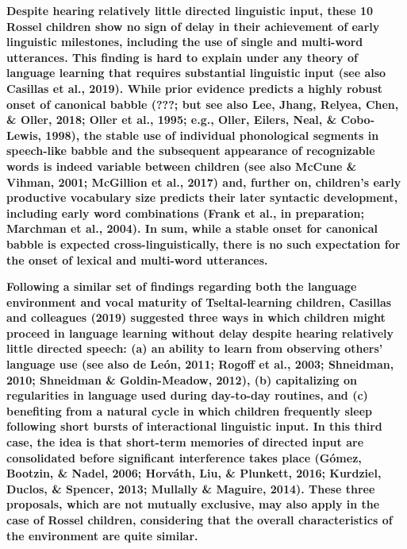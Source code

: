 \documentclass[,man,floatsintext]{apa6}
\begin{document}
\textbf{Despite hearing relatively little directed linguistic input,
these 10 Rossel children show no sign of delay in their achievement of
early linguistic milestones, including the use of single and multi-word
utterances. This finding is hard to explain under any theory of language
learning that requires substantial linguistic input (see also Casillas
et al., 2019). While prior evidence predicts a highly robust onset of
canonical babble ({\textbf{???}}; but see also Lee, Jhang, Relyea, Chen,
\& Oller, 2018; Oller et al., 1995; e.g., Oller, Eilers, Neal, \&
Cobo-Lewis, 1998), the stable use of individual phonological segments in
speech-like babble and the subsequent appearance of recognizable words
is indeed variable between children (see also McCune \& Vihman, 2001;
McGillion et al., 2017) and, further on, children's early productive
vocabulary size predicts their later syntactic development, including
early word combinations (Frank et al., in preparation; Marchman et al.,
2004). In sum, while a stable onset for canonical babble is expected
cross-linguistically, there is no such expectation for the onset of
lexical and multi-word utterances.}

\textbf{Following a similar set of findings regarding both the language
environment and vocal maturity of Tseltal-learning children, Casillas
and colleagues (2019) suggested three ways in which children might
proceed in language learning without delay despite hearing relatively
little directed speech: (a) an ability to learn from observing others'
language use (see also de León, 2011; Rogoff et al., 2003; Shneidman,
2010; Shneidman \& Goldin-Meadow, 2012), (b) capitalizing on
regularities in language used during day-to-day routines, and (c)
benefiting from a natural cycle in which children frequently sleep
following short bursts of interactional linguistic input. In this third
case, the idea is that short-term memories of directed input are
consolidated before significant interference takes place (Gómez,
Bootzin, \& Nadel, 2006; Horváth, Liu, \& Plunkett, 2016; Kurdziel,
Duclos, \& Spencer, 2013; Mullally \& Maguire, 2014). These three
proposals, which are not mutually exclusive, may also apply in the case
of Rossel children, considering that the overall characteristics of the
environment are quite similar.}
\end{document}
